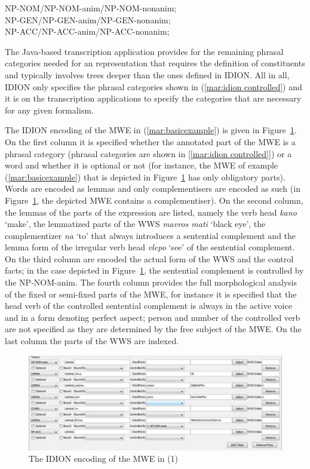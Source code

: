 \documentclass[output=paper]{langsci/langscibook}
\begin{document}
\ea\label{mar:idion controlled}
NP-NOM/NP-NOM-anim/NP-NOM-nonanim;\\ 
NP-GEN/NP-GEN-anim/NP-GEN-nonanim;\\ 
      NP-ACC/NP-ACC-anim/NP-ACC-nonanim; \\
\z

The Java-based transcription application provides for the remaining phrasal categories needed for an  representation that requires the definition of constituents and typically involves trees deeper than the ones defined in IDION. 
All in all, IDION only specifies the phrasal categories shown in  (\ref{mar:idion controlled}) and it is on the transcription applications to specify the categories that are necessary for any given formalism.

 The IDION encoding of the MWE in (\ref{mar:basicexample}) is given in Figure~\ref{mar:Sfig3}. On the first column it is specified whether the annotated part of the MWE is a phrasal category (phrasal categories are shown in [\ref{mar:idion controlled}]) or a word and whether it is optional or not (for instance, the MWE of example (\ref{mar:basicexample}) that is depicted in Figure~\ref{mar:Sfig3} has only obligatory parts). Words are encoded as lemmas and only complementisers are encoded as such (in Figure~\ref{mar:Sfig3}, the depicted MWE contains a complementiser).  On the second column, the lemmas of the parts of the expression are listed, namely the verb head \textit{kano} `make', the lemmatized parts of the WWS \textit{mavros mati} `black eye', the complementizer \textit{na} `to' that always  introduces a sentential complement and the lemma form of the irregular verb head \textit{vlepo} `see' of the sentential complement. On the third column are encoded the actual form of the WWS and the control facts; in the case depicted in Figure~\ref{mar:Sfig3},  the sentential complement is controlled by the NP-NOM-anim. The fourth column provides the full morphological analysis of the fixed or semi-fixed parts of the MWE, for instance it is specified that the head verb of the controlled sentential complement is always in the active voice and in a form denoting perfect aspect; person and number of the controlled verb are not specified as they are determined by the free subject of the MWE. On the last column the parts of the WWS are indexed. 

 \begin{figure}[h!]
  \caption{\label{mar:Sfig3}The IDION encoding of the MWE in (1)}
  \centering
 \includegraphics[width=1\textwidth]{figures/idionencoding}
\end{figure}
 
\end{document}

